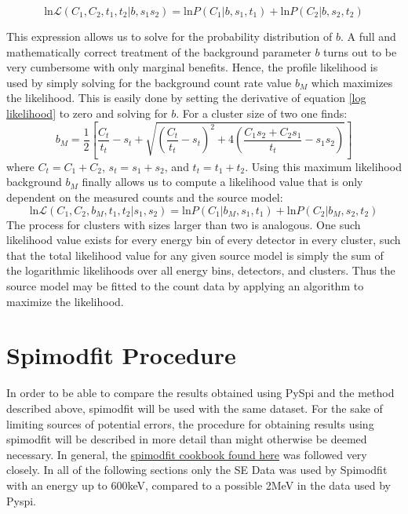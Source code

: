 \documentclass{article}
\begin{document}
\begin{equation}\label{log likelihood}
    \text{ln}\mathcal{L}(C_1, C_2, t_1, t_2\vert b, s_1 s_2) = \text{ln}P(C_1 \vert b, s_1, t_1) + \text{ln}P(C_2 \vert b, s_2, t_2)
\end{equation}

This expression allows us to solve for the probability distribution of $b$. A full and mathematically correct treatment of the background parameter $b$ turns out to be very cumbersome with only marginal benefits. Hence, the profile likelihood is used by simply solving for the background count rate value $b_M$ which maximizes the likelihood. This is easily done by setting the derivative of equation \ref{log likelihood} to zero and solving for $b$. For a cluster size of two one finds:
\begin{equation}
    b_M = \frac{1}{2} \left[ \frac{C_t}{t_t} - s_t + \sqrt{\left( \frac{C_t}{t_t} - s_t\right)^2 + 4 \left( \frac{C_1s_2+C_2s_1}{t_t}-s_1s_2\right)}\right]
\end{equation}
where $C_t=C_1+C_2$, $s_t=s_1+s_2$, and $t_t=t_1+t_2$. Using this maximum likelihood background $b_M$ finally allows us to compute a likelihood value that is only dependent on the measured counts and the source model:
\begin{equation}
    \text{ln}\mathcal{L}(C_1, C_2, b_M, t_1, t_2 \vert s_1, s_2) = \text{ln}P(C_1 \vert b_M, s_1, t_1) + \text{ln}P(C_2 \vert b_M, s_2, t_2)
\end{equation}
The process for clusters with sizes larger than two is analogous. One such likelihood value exists for every energy bin of every detector in every cluster, such that the total likelihood value for any given source model is simply the sum of the logarithmic likelihoods over all energy bins, detectors, and clusters. Thus the source model may be fitted to the count data by applying an algorithm to maximize the likelihood.


\section{Spimodfit Procedure}
In order to be able to compare the results obtained using PySpi and the method described above, spimodfit will be used with the same dataset. For the sake of limiting sources of potential errors, the procedure for obtaining results using spimodfit will be described in more detail than might otherwise be deemed necessary. In general, the  \href{https://www-cms.mpe.mpg.de/gamma/instruments/integral/www/}{spimodfit cookbook found here} was followed very closely. In all of the following sections only the SE Data was used by Spimodfit with an energy up to 600keV, compared to a possible 2MeV in the data used by Pyspi. 
\end{document}
